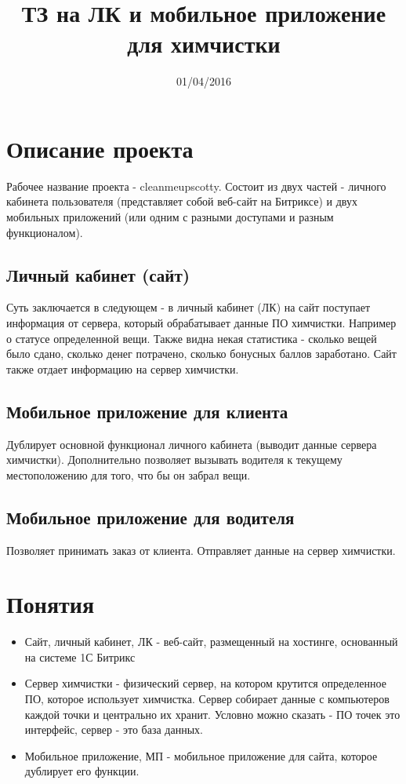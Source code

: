 \documentclass[DIV=calc, paper=a4, fontsize=11pt]{scrartcl} %
\title{ТЗ на ЛК и мобильное приложение для химчистки}
\date{01/04/2016}
\begin{document}
\maketitle

\section{Описание проекта}
Рабочее название проекта - cleanmeupscotty. Состоит из двух частей - личного кабинета пользователя (представляет собой веб-сайт на Битриксе) и двух мобильных приложений (или одним с разными доступами и разным функционалом).
\subsection{Личный кабинет (сайт)}
Суть заключается в следующем - в личный кабинет (ЛК) на сайт поступает информация от сервера, который обрабатывает данные ПО химчистки. Например о статусе определенной вещи. Также видна некая статистика - сколько вещей было сдано, сколько денег потрачено, сколько бонусных баллов заработано. Сайт также отдает информацию на сервер химчистки.
\subsection{Мобильное приложение для клиента}
Дублирует основной функционал личного кабинета (выводит данные сервера химчистки). Дополнительно позволяет вызывать водителя к текущему местоположению для того, что бы он забрал вещи.
\subsection{Мобильное приложение для водителя}
Позволяет принимать заказ от клиента. Отправляет данные на сервер химчистки.

\section{Понятия}

\begin{itemize}
	\item Сайт, личный кабинет, ЛК - веб-сайт, размещенный на хостинге, основанный на системе 1С Битрикс
	\item Сервер химчистки - физический сервер, на котором крутится определенное ПО, которое использует химчистка. Сервер собирает данные с компьютеров каждой точки и центрально их хранит. Условно можно сказать - ПО точек это интерфейс, сервер - это база данных.
	\item Мобильное приложение, МП - мобильное приложение для сайта, которое дублирует его функции.
\end{itemize}
\end{document}
